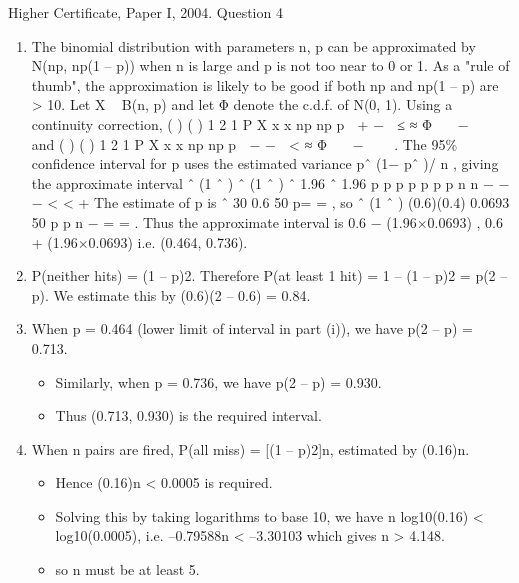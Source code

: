 \documentclass[a4paper,12pt]{article}
\begin{document}
Higher Certificate, Paper I, 2004. Question 4

\begin{enumerate}
\item  The binomial distribution with parameters n, p can be approximated by
N(np, np(1 – p)) when n is large and p is not too near to 0 or 1. As a "rule of thumb",
the approximation is likely to be good if both np and np(1 – p) are > 10.
Let X ~ B(n, p) and let Φ denote the c.d.f. of N(0, 1). Using a continuity correction,
( )
( )
1
2
1
P X x x np
np p
 + −  ≤ ≈ Φ 
 −   
and ( )
( )
1
2
1
P X x x np
np p
 − −  < ≈ Φ 
 −   
.
The 95\% confidence interval for p uses the estimated variance pˆ (1− pˆ )/ n , giving the
approximate interval
ˆ (1 ˆ ) ˆ (1 ˆ )
ˆ 1.96 ˆ 1.96
p p p p
p p p
n n
− −
− < < +
The estimate of p is ˆ 30 0.6
50
p= = , so ˆ (1 ˆ ) (0.6)(0.4)
0.0693
50
p p
n
−
= = . Thus
the approximate interval is
0.6 − (1.96×0.0693) , 0.6 + (1.96×0.0693)
i.e. (0.464, 0.736).
\item  P(neither hits) = (1 – p)2. Therefore P(at least 1 hit) = 1 – (1 – p)2 = p(2 – p).
We estimate this by (0.6)(2 – 0.6) = 0.84.
\item  When p = 0.464 (lower limit of interval in part (i)), we have p(2 – p) = 0.713.

\begin{itemize}
\item Similarly, when p = 0.736, we have p(2 – p) = 0.930. 
\item Thus (0.713, 0.930) is the
required interval.
\end{itemize}
\item  When n pairs are fired, P(all miss) = [(1 – p)2]n, estimated by (0.16)n. 
\begin{itemize}
    \item Hence
(0.16)n < 0.0005 is required. 
\item Solving this by taking logarithms to base 10, we have
n log10(0.16) < log10(0.0005), i.e. –0.79588n < –3.30103 which gives n > 4.148. 
\item so n
must be at least 5.
\end{itemize}

\end{enumerate}
\end{document}
